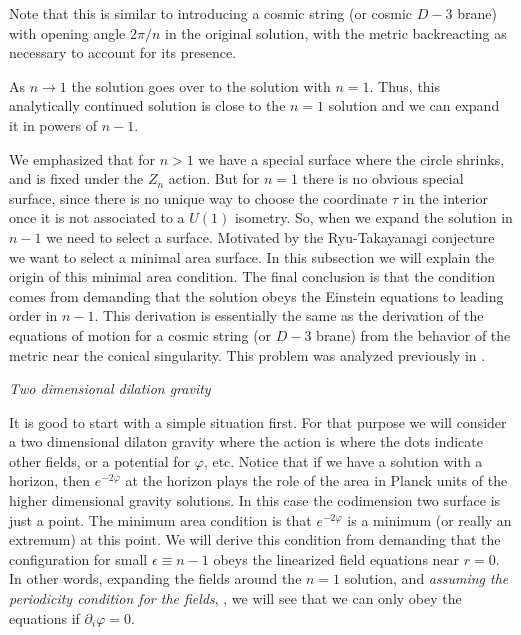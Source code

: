 Note that this is similar to introducing a cosmic string (or cosmic $D-3$ brane)
 with opening angle $2 \pi/n$ in the original
 solution, with the metric backreacting as necessary to account for its presence.


As $n\to 1$   the solution goes over to the solution with $n=1$.
Thus, this analytically continued solution is close  to the $n=1$ solution and we can expand it in
powers of $n-1$.





We emphasized that for $n>1$ we have a special surface where the circle shrinks, and is fixed  under
 the $Z_n$ action. But for $n=1$ there is no obvious special surface,
 since there is no unique way to choose the coordinate $\tau$ in the
interior once it is not associated to a $U(1)$ isometry. So, when we expand the solution in $n-1$ we need to
select a surface. Motivated by the Ryu-Takayanagi conjecture we want to select a minimal area surface. In this subsection
we will explain the origin of this minimal area condition. The final conclusion is that the condition comes
from demanding that the solution obeys the Einstein equations to leading order in $n-1$.
This derivation is essentially the same as the derivation of the equations of motion for a cosmic string
(or $D-3$ brane) from the behavior of the metric near the conical singularity. This
problem was analyzed previously in  .



{\it Two dimensional dilation gravity }

It is good to start with a simple situation first. For that purpose we will consider a two dimensional dilaton gravity
  where the action is
\eqn{}
where the dots indicate other fields, or a potential for $\varphi$, etc. Notice that if we have a solution with a
horizon, then $e^{ - 2 \varphi} $ at the horizon
plays the role of the area in Planck units of the higher dimensional gravity solutions.
 In this case the codimension two surface is just a point.
The minimum  area condition is that $e^{ - 2 \varphi } $ is  a minimum (or really an extremum)
 at this point.
We will derive this condition from demanding that the configuration for  small $\epsilon \equiv n-1$ obeys the linearized
field equations near $r=0$.
In other words, expanding the fields around the $n=1$ solution, and {\it assuming the periodicity condition for the
fields}, \perfields ,  we will see that we can only obey the equations if $\partial_i \varphi =0$.


